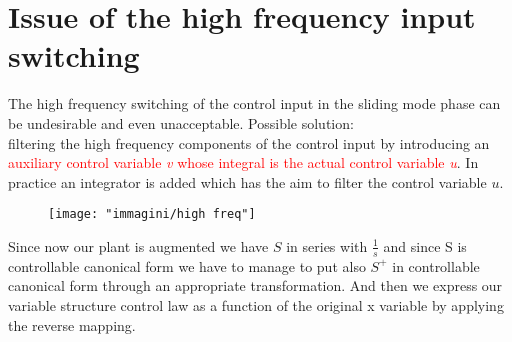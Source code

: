 \section{Issue of the high frequency input switching}
The high frequency switching of the control input in the sliding mode phase can be undesirable and even unacceptable.
Possible solution:\\
filtering the high frequency components of the control input by introducing an \textcolor{red}{auxiliary control variable \emph{v} whose integral is the actual control variable \emph{u}}. In practice an integrator is added which has the aim to filter the control variable $u$.
\begin{figure}[H]
	\centering
	\texttt{[image: "immagini/high freq"]}
	\label{fig:high-freq}
	\caption{}
\end{figure}
Since now our plant is augmented we have $S$ in series with $\frac{1}{s}$ and since S is controllable canonical form we have to manage to put also $S^+$ in controllable canonical form through an appropriate transformation. And then we express our variable structure control law as a function of the original x variable by applying the reverse mapping.
